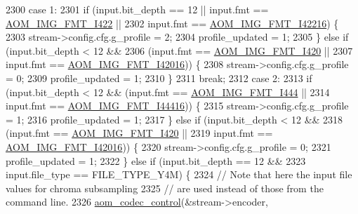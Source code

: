 \begin{DoxyCodeInclude}
{{{{{{{{{{{{{{{{{{{{{{{{{{{{{{{{{{{{{{{{{{{{{{{{{{{{2300           \textcolor{keywordflow}{case} 1:
2301             \textcolor{keywordflow}{if} (input.bit\_depth == 12 || input.fmt == \hyperlink{aom__image_8h_a930317c04b4bd0a660bb5e744055523cab2f75281e94ebc0f0bc728ef287cd3e8}{AOM\_IMG\_FMT\_I422} ||
2302                 input.fmt == \hyperlink{aom__image_8h_a930317c04b4bd0a660bb5e744055523ca064683ed4260fc6244af6cfc9d261c22}{AOM\_IMG\_FMT\_I42216}) \{
2303               stream->config.cfg.g\_profile = 2;
2304               profile\_updated = 1;
2305             \} \textcolor{keywordflow}{else} \textcolor{keywordflow}{if} (input.bit\_depth < 12 &&
2306                        (input.fmt == \hyperlink{aom__image_8h_a930317c04b4bd0a660bb5e744055523cabd778a3d697463e89d12a1117f417b60}{AOM\_IMG\_FMT\_I420} ||
2307                         input.fmt == \hyperlink{aom__image_8h_a930317c04b4bd0a660bb5e744055523ca20a9cf30277260685642b4cfb4e9273b}{AOM\_IMG\_FMT\_I42016})) \{
2308               stream->config.cfg.g\_profile = 0;
2309               profile\_updated = 1;
2310             \}
2311             \textcolor{keywordflow}{break};
2312           \textcolor{keywordflow}{case} 2:
2313             \textcolor{keywordflow}{if} (input.bit\_depth < 12 && (input.fmt == \hyperlink{aom__image_8h_a930317c04b4bd0a660bb5e744055523ca89d423506e948ab7d3b98b5750b92655}{AOM\_IMG\_FMT\_I444} ||
2314                                          input.fmt == \hyperlink{aom__image_8h_a930317c04b4bd0a660bb5e744055523cab9b93d397dedbdd6bfafec84d1f8f0f5}{AOM\_IMG\_FMT\_I44416})) \{
2315               stream->config.cfg.g\_profile = 1;
2316               profile\_updated = 1;
2317             \} \textcolor{keywordflow}{else} \textcolor{keywordflow}{if} (input.bit\_depth < 12 &&
2318                        (input.fmt == \hyperlink{aom__image_8h_a930317c04b4bd0a660bb5e744055523cabd778a3d697463e89d12a1117f417b60}{AOM\_IMG\_FMT\_I420} ||
2319                         input.fmt == \hyperlink{aom__image_8h_a930317c04b4bd0a660bb5e744055523ca20a9cf30277260685642b4cfb4e9273b}{AOM\_IMG\_FMT\_I42016})) \{
2320               stream->config.cfg.g\_profile = 0;
2321               profile\_updated = 1;
2322             \} \textcolor{keywordflow}{else} \textcolor{keywordflow}{if} (input.bit\_depth == 12 &&
2323                        input.file\_type == FILE\_TYPE\_Y4M) \{
2324               \textcolor{comment}{// Note that here the input file values for chroma subsampling}
2325               \textcolor{comment}{// are used instead of those from the command line.}
2326               \hyperlink{group__codec_ga6da974f4eeaba1fa74106b28d0fe6ac5}{aom\_codec\_control}(&stream->encoder, 
}}}}}}}}}}}}}}}}}}}}}}}}}}}}}}}}}}}}}}}}}}}}}}}}}}}}
\end{DoxyCodeInclude}

